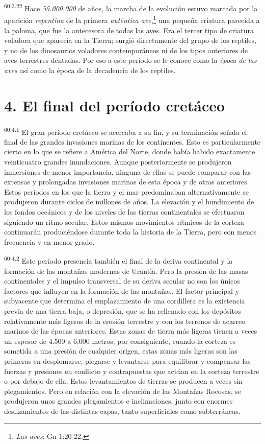 \par
\textsuperscript{60:3.22} Hace \textit{55.000.000} de años, la marcha de la evolución estuvo marcada por la aparición \textit{repentina} de la primera \textit{auténtica ave},\footnote{\textit{Las aves}: Gn 1:20-22.} una pequeña criatura parecida a la paloma, que fue la antecesora de todas las aves. Era el tercer tipo de criatura voladora que aparecía en la Tierra; surgió directamente del grupo de los reptiles, y no de los dinosaurios voladores contemporáneos ni de los tipos anteriores de aves terrestres dentadas. Por eso a este período se le conoce como la \textit{época de las aves} así como la época de la decadencia de los reptiles.

\section*{4. El final del período cretáceo}
\par
\textsuperscript{60:4.1} El gran período cretáceo se acercaba a su fin, y su terminación señala el final de las grandes invasiones marinas de los continentes. Esto es particularmente cierto en lo que se refiere a América del Norte, donde había habido exactamente veinticuatro grandes inundaciones. Aunque posteriormente se produjeron inmersiones de menor importancia, ninguna de ellas se puede comparar con las extensas y prolongadas invasiones marinas de esta época y de otras anteriores. Estos períodos en los que la tierra y el mar predominaban alternativamente se produjeron durante ciclos de millones de años. La elevación y el hundimiento de los fondos oceánicos y de los niveles de las tierras continentales se efectuaron siguiendo un ritmo secular. Estos mismos movimientos rítmicos de la corteza continuarán produciéndose durante toda la historia de la Tierra, pero con menos frecuencia y en menor grado.

\par
\textsuperscript{60:4.2} Este período presencia también el final de la deriva continental y la formación de las montañas modernas de Urantia. Pero la presión de las masas continentales y el impulso transversal de su deriva secular no son los únicos factores que influyen en la formación de las montañas. El factor principal y subyacente que determina el emplazamiento de una cordillera es la existencia previa de una tierra baja, o depresión, que se ha rellenado con los depósitos relativamente más ligeros de la erosión terrestre y con los terrenos de acarreo marinos de las épocas anteriores. Estas zonas de tierra más ligeras tienen a veces un espesor de 4.500 a 6.000 metros; por consiguiente, cuando la corteza es sometida a una presión de cualquier origen, estas zonas más ligeras son las primeras en desplomarse, plegarse y levantarse para equilibrar y compensar las fuerzas y presiones en conflicto y contrapuestas que actúan en la corteza terrestre o por debajo de ella. Estos levantamientos de tierras se producen a veces sin plegamientos. Pero en relación con la elevación de las Montañas Rocosas, se produjeron unos grandes plegamientos e inclinaciones, junto con enormes deslizamientos de las distintas capas, tanto superficiales como subterráneas.

